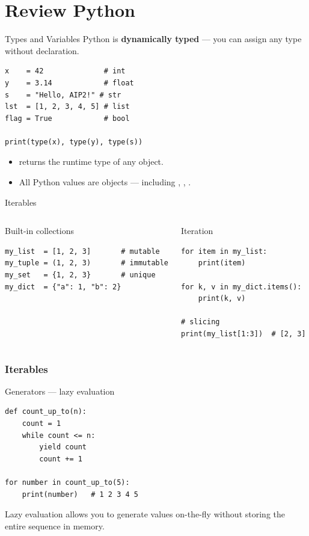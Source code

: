 \section{Review Python}

\begin{frame}[fragile]{Types and Variables}
    Python is \textbf{dynamically typed} --- you can assign any type without declaration.

    \begin{lstlisting}
x    = 42              # int
y    = 3.14            # float
s    = "Hello, AIP2!" # str
lst  = [1, 2, 3, 4, 5] # list
flag = True            # bool

print(type(x), type(y), type(s))
    \end{lstlisting}

    \begin{itemize}
        \item {} returns the runtime type of any object.
        \item All Python values are objects --- including , , .
    \end{itemize}
\end{frame}

\begin{frame}[fragile]{Iterables}
    \begin{columns}[t]
    \begin{block}{Built-in collections}
    \begin{lstlisting}
my_list  = [1, 2, 3]       # mutable
my_tuple = (1, 2, 3)       # immutable
my_set   = {1, 2, 3}       # unique
my_dict  = {"a": 1, "b": 2}
    \end{lstlisting}
    \end{block}

    \begin{block}{Iteration}
    \begin{lstlisting}
for item in my_list:
    print(item)

for k, v in my_dict.items():
    print(k, v)

# slicing
print(my_list[1:3])  # [2, 3]
    \end{lstlisting}
    \end{block}
    \end{columns}

\end{frame}

\begin{frame}[fragile]
    \frametitle{Iterables}
     \begin{block}{Generators --- lazy evaluation}
    \begin{lstlisting}
def count_up_to(n):
    count = 1
    while count <= n:
        yield count
        count += 1

for number in count_up_to(5):
    print(number)   # 1 2 3 4 5
    \end{lstlisting}
    \end{block}

    Lazy evaluation allows you to generate values on-the-fly without storing the entire sequence in memory.
\end{frame}

